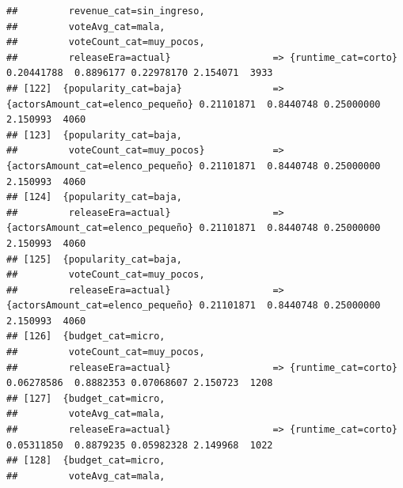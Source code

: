 \documentclass[
]{article}
\begin{document}
\begin{verbatim}
##         revenue_cat=sin_ingreso,                                                                                                
##         voteAvg_cat=mala,                                                                                                       
##         voteCount_cat=muy_pocos,                                                                                                
##         releaseEra=actual}                  => {runtime_cat=corto}               0.20441788  0.8896177 0.22978170 2.154071  3933
## [122]  {popularity_cat=baja}                => {actorsAmount_cat=elenco_pequeño} 0.21101871  0.8440748 0.25000000 2.150993  4060
## [123]  {popularity_cat=baja,                                                                                                    
##         voteCount_cat=muy_pocos}            => {actorsAmount_cat=elenco_pequeño} 0.21101871  0.8440748 0.25000000 2.150993  4060
## [124]  {popularity_cat=baja,                                                                                                    
##         releaseEra=actual}                  => {actorsAmount_cat=elenco_pequeño} 0.21101871  0.8440748 0.25000000 2.150993  4060
## [125]  {popularity_cat=baja,                                                                                                    
##         voteCount_cat=muy_pocos,                                                                                                
##         releaseEra=actual}                  => {actorsAmount_cat=elenco_pequeño} 0.21101871  0.8440748 0.25000000 2.150993  4060
## [126]  {budget_cat=micro,                                                                                                       
##         voteCount_cat=muy_pocos,                                                                                                
##         releaseEra=actual}                  => {runtime_cat=corto}               0.06278586  0.8882353 0.07068607 2.150723  1208
## [127]  {budget_cat=micro,                                                                                                       
##         voteAvg_cat=mala,                                                                                                       
##         releaseEra=actual}                  => {runtime_cat=corto}               0.05311850  0.8879235 0.05982328 2.149968  1022
## [128]  {budget_cat=micro,                                                                                                       
##         voteAvg_cat=mala,                                                                                                       

\end{verbatim}
\end{document}
